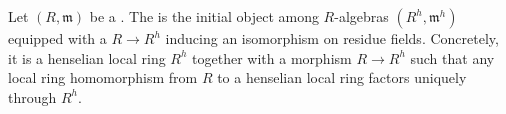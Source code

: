 \begin{definition}[Henselization] \label{definition:henselization_of_a_local_ring}
Let $(R, \mathfrak{m})$ be a . The  is the initial object among  $R$-algebras $(R^h, \mathfrak{m}^h)$ equipped with a  $R \to R^h$ inducing an isomorphism on residue fields. Concretely, it is a henselian local ring $R^h$ together with a morphism $R \to R^h$ such that any local ring homomorphism from $R$ to a henselian local ring factors uniquely through $R^h$.
\end{definition}
